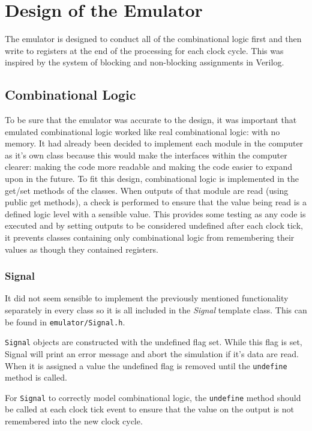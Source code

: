 \documentclass[11pt,a4paper]{IEEEtran}
\begin{document}
	\section{Design of the Emulator}
                The emulator is designed to conduct all of the combinational logic first and then write to registers at the end of the processing for each clock cycle. This was inspired by the system of blocking and non-blocking assignments in Verilog.

		\subsection{Combinational Logic}
			To be sure that the emulator was accurate to the design, it was important that emulated combinational logic worked like real combinational logic: with no memory. It had already been decided to implement each module in the computer as it's own class because this would make the interfaces within the computer clearer: making the code more readable and making the code easier to expand upon in the future. To fit this design, combinational logic is implemented in the get/set methods of the classes. When outputs of that module are read (using public get methods), a check is performed to ensure that the value being read is a defined logic level with a sensible value. This provides some testing as any code is executed and by setting outputs to be considered undefined after each clock tick, it prevents classes containing only combinational logic from remembering their values as though they contained registers.
			
			\subsubsection{Signal}
				It did not seem sensible to implement the previously mentioned functionality separately in every class so it is all included in the \textit{Signal} template class. This can be found in \texttt{emulator/Signal.h}. 
				
				\texttt{Signal} objects are constructed with the undefined flag set. While this flag is set, Signal will print an error message and abort the simulation if it's data are read. When it is assigned a value the undefined flag is removed until the \texttt{undefine} method is called.
				
				For \texttt{Signal} to correctly model combinational logic, the \texttt{undefine} method should be called at each clock tick event to ensure that the value on the output is not remembered into the new clock cycle.
			
\end{document}
